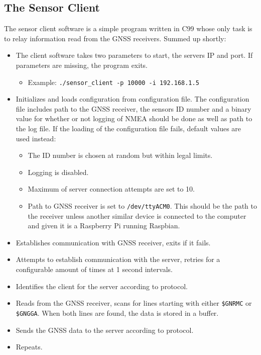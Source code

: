 \documentclass[12pt,english,a4paper]{report}
\begin{document}
\subsection{The Sensor Client}
The sensor client software is a simple program written in C99 whose only task is to relay information read from the GNSS receivers. Summed up shortly:
\begin{itemize}
  \item The client software takes two parameters to start, the servers IP and port. If parameters are missing, the program exits.
  \begin{itemize}
    \item Example: \texttt{./sensor\_client -p 10000 -i 192.168.1.5}
  \end{itemize}
  \item Initializes and loads configuration from configuration file. The configuration file includes path to the GNSS receiver, the sensors ID number and a binary value for whether or not logging of NMEA should be done as well as path to 
  the log file. If the loading of the configuration file fails, default values are used instead:
  \begin{itemize}
    \item The ID number is chosen at random but within legal limits.
    \item Logging is disabled.
    \item Maximum of server connection attempts are set to 10.
    \item Path to GNSS receiver is set to \texttt{/dev/ttyACM0}. This should be the path to the receiver unless another similar device is connected to the computer and given it is a Raspberry Pi running Raspbian.
  \end{itemize}
  \item Establishes communication with GNSS receiver, exits if it fails.
  \item Attempts to establish communication with the server, retries for a configurable amount of times at 1 second intervals.
  \item Identifies the client for the server according to protocol.
  \item Reads from the GNSS receiver, scans for lines starting with either \texttt{\$GNRMC} or \texttt{\$GNGGA}. When both lines are found, the data is stored in a buffer.
  \item Sends the GNSS data to the server according to protocol.
  \item Repeats.
\end{itemize}
\end{document}
